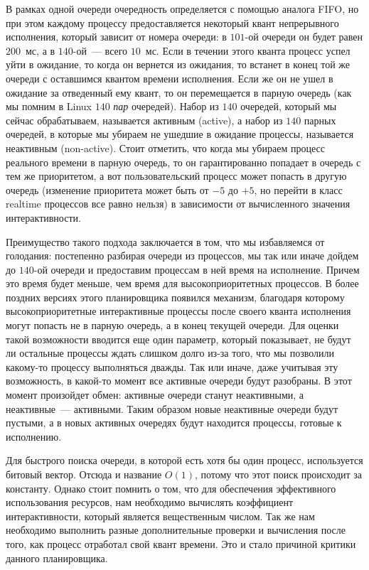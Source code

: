 В рамках одной очереди очередность определяется с помощью аналога FIFO, но при
этом каждому процессу предоставляется некоторый квант непрерывного исполнения,
который зависит от номера очереди: в \(101\)-ой очереди он будет равен
\(200\)~мс, а в \(140\)-ой~--- всего \(10\)~мс. Если в течении этого кванта
процесс успел уйти в ожидание, то когда он вернется из ожидания, то встанет в
конец той же очереди с оставшимся квантом времени исполнения. Если же он не ушел
в ожидание за отведенный ему квант, то он перемещается в парную очередь (как мы
помним в Linux \(140\) \textit{пар} очередей). Набор из \(140\) очередей,
который мы сейчас обрабатываем, называется активным (active), а набор из \(140\)
парных очередей, в которые мы убираем не ушедшие в ожидание процессы, называется
неактивным (non-active). Стоит отметить, что когда мы убираем процесс реального
времени в парную очередь, то он гарантированно попадает в очередь с тем же
приоритетом, а вот пользовательский процесс может попасть в другую очередь
(изменение приоритета может быть от \(-5\) до \(+5\), но перейти в класс
realtime процессов все равно нельзя) в зависимости от вычисленного значения
интерактивности.

Преимущество такого подхода заключается в том, что мы избавляемся от голодания:
постепенно разбирая очереди из процессов, мы так или иначе дойдем до \(140\)-ой
очереди и предоставим процессам в ней время на исполнение. Причем это время
будет меньше, чем время для высокоприоритетных процессов. В более поздних
версиях этого планировщика появился механизм, благодаря которому
высокоприоритетные интерактивные процессы после своего кванта исполнения могут
попасть не в парную очередь, а в конец текущей очереди. Для оценки такой
возможности вводится еще один параметр, который показывает, не будут ли
остальные процессы ждать слишком долго из-за того, что мы позволили какому-то
процессу выполняться дважды. Так или иначе, даже учитывая эту возможность, в
какой-то момент все активные очереди будут разобраны. В этот момент произойдет
обмен: активные очереди станут неактивными, а неактивные~--- активными. Таким
образом новые неактивные очереди будут пустыми, а в новых активных очередях
будут находится процессы, готовые к исполнению.

Для быстрого поиска очереди, в которой есть хотя бы один процесс, используется
битовый вектор. Отсюда и название \(O(1)\), потому что этот поиск происходит за
константу. Однако стоит помнить о том, что для обеспечения эффективного
использования ресурсов, нам необходимо вычислять коэффициент интерактивности,
который является вещественным числом. Так же нам необходимо выполнить разные
дополнительные проверки и вычисления после того, как процесс отработал свой
квант времени. Это и стало причиной критики данного планировщика.


